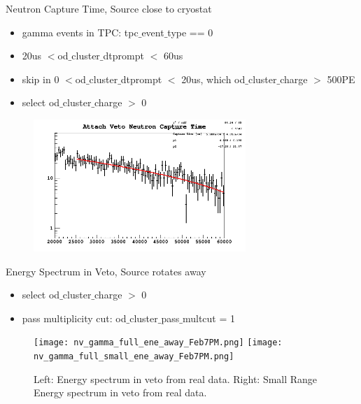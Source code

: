 \documentclass[9pt]{beamer}
\begin{document}
\begin{frame}{Neutron Capture Time, Source close to cryostat}
\begin{itemize}
[bullet]
\item gamma events in TPC: tpc$\_$event$\_$type == 0
\item 20us $<$od$\_$cluster$\_$dtprompt $<$ 60us
\item skip in 0 $<$od$\_$cluster$\_$dtprompt $<$ 20us, which od$\_$cluster$\_$charge $>$ 500PE
\item  select od$\_$cluster$\_$charge $>$ 0
\end{itemize}
\begin{figure}
\includegraphics[height= 5cm, width=.8\textwidth]{attach_capture_time_Feb7PM.png}
\end{figure}
\end{frame}


\begin{frame}{Energy Spectrum in Veto, Source rotates away}
\begin{itemize}
[bullet]
\item  select od$\_$cluster$\_$charge $>$ 0
\item pass multiplicity cut: od$\_$cluster$\_$pass$\_$multcut = 1  
\end{itemize}
\begin{figure}
\texttt{[image: nv\_gamma\_full\_ene\_away\_Feb7PM.png]}
\texttt{[image: nv\_gamma\_full\_small\_ene\_away\_Feb7PM.png]}
\caption{Left: Energy spectrum in veto from real data. Right: Small Range Energy spectrum in veto from real data.}
\end{figure}
\end{frame}
\end{document}
